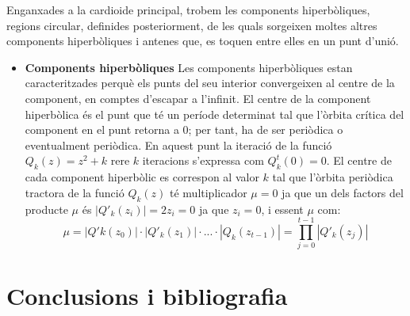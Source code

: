 \documentclass[12pt]{report}
\begin{document}
Enganxades a la cardioide principal, trobem les components hiperbòliques, regions circular, definides posteriorment, de les quals sorgeixen moltes altres components hiperbòliques i antenes que, es toquen entre elles en un punt d'unió.
 \newline
 \begin{itemize}
 \justifying
     \item \textbf{Components hiperbòliques}
     \newline
 Les components hiperbòliques estan caracteritzades perquè els punts del seu interior convergeixen al centre de la component, en comptes d'escapar a l'infinit.
\newline
El centre de la component hiperbòlica és el punt que té un període determinat tal que l'òrbita crítica del component en el punt retorna a 0; per tant, ha de ser periòdica o eventualment periòdica.
En aquest punt la iteració de la funció $Q_k(z)=z^2+k$ rere $k$ iteracions s'expressa com $Q^t_k(0)=0$.
 \newline
 El centre de cada component hiperbòlic es correspon al valor $k$ tal que l'òrbita periòdica tractora de la funció $Q_k(z)$ té multiplicador $\mu =0$ ja que un dels factors del producte  $\mu$ és $|Q'_k(z_i)|= 2z_i = 0$ ja que $z_i=0$, i essent $\mu$ com: 
 $$\mu = |Q'k(z_0)| \cdot |Q'_k(z_1)| \cdot ... \cdot |Q_k(z_{t-1})| = \prod_{j=0}^{t-1} |Q'_k(z_j)| $$
 \end{itemize}
\chapter{Conclusions i bibliografia}
\end{document}
